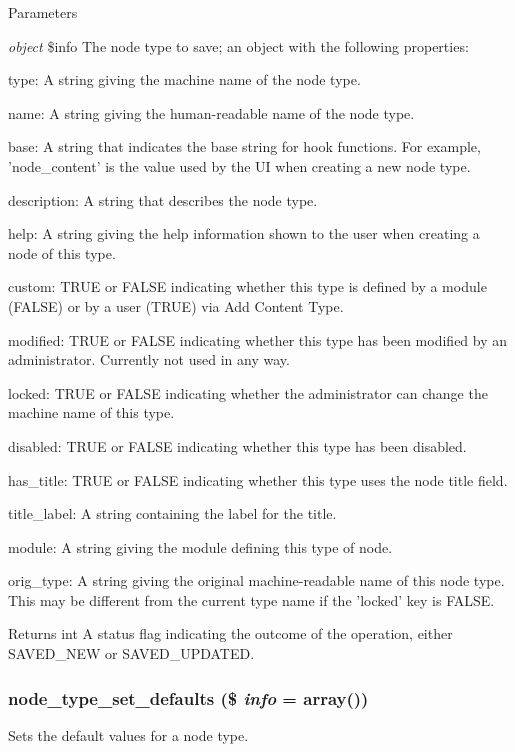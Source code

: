 \begin{DoxyParams}{Parameters}
\item[{\em object}]\$info The node type to save; an object with the following properties:
\begin{DoxyItemize}
\item type: A string giving the machine name of the node type.
\item name: A string giving the human-\/readable name of the node type.
\item base: A string that indicates the base string for hook functions. For example, 'node\_\-content' is the value used by the UI when creating a new node type.
\item description: A string that describes the node type.
\item help: A string giving the help information shown to the user when creating a node of this type.
\item custom: TRUE or FALSE indicating whether this type is defined by a module (FALSE) or by a user (TRUE) via Add Content Type.
\item modified: TRUE or FALSE indicating whether this type has been modified by an administrator. Currently not used in any way.
\item locked: TRUE or FALSE indicating whether the administrator can change the machine name of this type.
\item disabled: TRUE or FALSE indicating whether this type has been disabled.
\item has\_\-title: TRUE or FALSE indicating whether this type uses the node title field.
\item title\_\-label: A string containing the label for the title.
\item module: A string giving the module defining this type of node.
\item orig\_\-type: A string giving the original machine-\/readable name of this node type. This may be different from the current type name if the 'locked' key is FALSE.
\end{DoxyItemize}\end{DoxyParams}
\begin{DoxyReturn}{Returns}
int A status flag indicating the outcome of the operation, either SAVED\_\-NEW or SAVED\_\-UPDATED. 
\end{DoxyReturn}
\hypertarget{node_8module_a09f802ffaf307aebf9578a93fed025f9}{
\subsubsection[{node\_\-type\_\-set\_\-defaults}]{\setlength{\rightskip}{0pt plus 5cm}node\_\-type\_\-set\_\-defaults (\$ {\em info} = {\ttfamily array()})}}
\label{node_8module_a09f802ffaf307aebf9578a93fed025f9}
Sets the default values for a node type.

